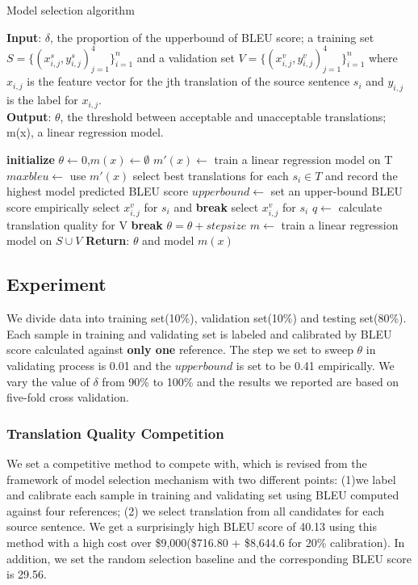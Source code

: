\documentclass[11pt,letterpaper]{article}
\begin{document}
\begin{algorithm} [h!]
\caption{Model selection algorithm}\label{modelselection}
\textbf{Input}: $\delta$, the proportion of the upperbound of BLEU score; a training set $S = \{(x^{s}_{i,j},y^{s}_{i,j})_{j=1}^{4}\}_{i=1}^n$ and a validation set $V = \{(x^{v}_{i,j},y^{v}_{i,j})_{j=1}^{4}\}_{i=1}^n$ where $x_{i,j}$ is the feature vector for the jth translation of the source sentence $s_{i}$ and $y_{i,j}$ is the label for $x_{i,j}$.\\
\textbf{Output}: $\theta$, the threshold between acceptable and unacceptable translations; m(x), a linear regression model. 
\begin{algorithmic}[1]
\State \textbf{initialize} $\theta \leftarrow 0$,$m(x)\leftarrow \emptyset$ 
\State $m'(x)\leftarrow$ train a linear regression model on T
\State $maxbleu \leftarrow$ use $m'(x)$ select best translations for each $s_i \in T$ and record the highest model predicted BLEU score
\State $upperbound \leftarrow$ set an upper-bound BLEU score empirically
             select $x^{v}_{i,j}$ for $s_i$ and \textbf{break}
\EndIf
{} select $x^{v}_{i,j}$ for $s_i$
\EndIf
\EndFor
\EndFor
\State $q \leftarrow$ calculate translation quality for V
 \textbf{break}
\Else \text{  } $\theta = \theta + stepsize$
\EndIf
\EndWhile
\State $m \leftarrow$ train a linear regression model on $S \cup V$
\State \textbf{Return}: $\theta$ and model $m(x)$
\end{algorithmic}
\end{algorithm}
\subsection{Experiment}
 We divide data into training set(10\%), validation set(10\%) and testing set(80\%). Each sample in training and validating set is labeled and calibrated by BLEU score calculated against \textbf{only one} reference. The step we set to sweep $\theta$ in validating process is 0.01 and the $upperbound$ is set to be 0.41 empirically. We vary the value of $\delta$ from 90\% to 100\% and the results we reported are based on five-fold cross validation.
 \subsubsection{Translation Quality Competition}
 We set a competitive method to compete with, which is revised from the framework of model selection mechanism with two different points: (1)we label and calibrate each sample in training and validating set using BLEU computed against four references; (2) we select translation from all candidates for each source sentence. We get a surprisingly high BLEU score of 40.13 using this method with a high cost over \$9,000(\$716.80 + \$8,644.6 for 20\% calibration). In addition, we set the random selection baseline and the corresponding BLEU score is 29.56.
\end{document}

